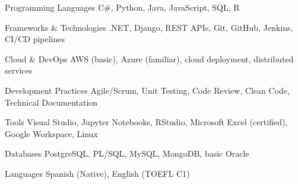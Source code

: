 
\begin{cvskills}

  \cvskill
    {Programming Languages}
    {C\#, Python, Java, JavaScript, SQL, R}

  \cvskill
    {Frameworks \& Technologies}
    {.NET, Django, REST APIs, Git, GitHub, Jenkins, CI/CD pipelines}

  \cvskill
    {Cloud \& DevOps}
    {AWS (basic), Azure (familiar), cloud deployment, distributed services}

  \cvskill
    {Development Practices}
    {Agile/Scrum, Unit Testing, Code Review, Clean Code, Technical Documentation}

  \cvskill
    {Tools}
    {Visual Studio, Jupyter Notebooks, RStudio, Microsoft Excel (certified), Google Workspace, Linux}

  \cvskill
    {Databases}
    {PostgreSQL, PL/SQL, MySQL, MongoDB, basic Oracle}

  \cvskill
    {Languages}
    {Spanish (Native), English (TOEFL C1)}

\end{cvskills}
